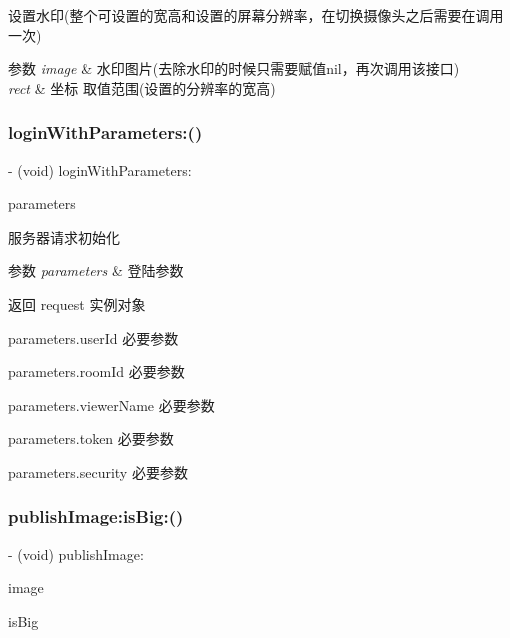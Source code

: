 设置水印(整个可设置的宽高和设置的屏幕分辨率，在切换摄像头之后需要在调用一次) 


\begin{DoxyParams}{参数}
{\em image} & 水印图片(去除水印的时候只需要赋值nil，再次调用该接口) \\
\hline
{\em rect} & 坐标 取值范围(设置的分辨率的宽高) \\
\hline
\end{DoxyParams}
\mbox{\label{interface_c_c_push_util_ae4f1a2d7f38053c47273360091c5c4ad}} 
\subsubsection{\texorpdfstring{login\+With\+Parameters\+:()}{loginWithParameters:()}}
{\footnotesize\ttfamily -\/ (void) login\+With\+Parameters\+: \begin{DoxyParamCaption}\item[{(\hyperlink{interface_push_parameters}{Push\+Parameters} $\ast$)}]{parameters }\end{DoxyParamCaption}}



服务器请求初始化 


\begin{DoxyParams}{参数}
{\em parameters} & 登陆参数 \\
\hline
\end{DoxyParams}
\begin{DoxyReturn}{返回}
request 实例对象 

parameters.\+user\+Id 必要参数 

parameters.\+room\+Id 必要参数 

parameters.\+viewer\+Name 必要参数 

parameters.\+token 必要参数 

parameters.\+security 必要参数 
\end{DoxyReturn}
\mbox{\label{interface_c_c_push_util_abeb3c0560246853b40729b3e091ef988}} 
\subsubsection{\texorpdfstring{publish\+Image\+:is\+Big\+:()}{publishImage:isBig:()}}
{\footnotesize\ttfamily -\/ (void) publish\+Image\+: \begin{DoxyParamCaption}\item[{(U\+I\+Image $\ast$)}]{image }\item[{isBig:(B\+O\+OL)}]{is\+Big }\end{DoxyParamCaption}}



